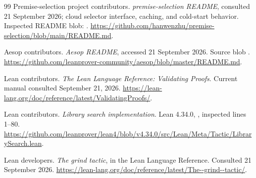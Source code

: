 \begin{thebibliography}{99}
 Premise-selection project contributors. \emph{premise-selection README},
consulted 21 September 2026; cloud selector interface, caching, and cold-start
behavior. Inspected README blob:
.
\url{https://github.com/hanwenzhu/premise-selection/blob/main/README.md}.

 Aesop contributors. \emph{Aesop README}, accessed 21 September 2026.
Source blob .
\url{https://github.com/leanprover-community/aesop/blob/master/README.md}.

 Lean contributors. \emph{The Lean Language Reference:
Validating Proofs}. Current manual consulted September 21, 2026.
\url{https://lean-lang.org/doc/reference/latest/ValidatingProofs/}.

 Lean contributors. \emph{Library search implementation}.
Lean 4.34.0, , inspected lines 1--80.
\url{https://github.com/leanprover/lean4/blob/v4.34.0/src/Lean/Meta/Tactic/LibrarySearch.lean}.

 Lean developers.
\emph{The grind tactic}, in the Lean Language Reference.
Consulted 21 September 2026.
\url{https://lean-lang.org/doc/reference/latest/The--grind--tactic/}.

\end{thebibliography}
